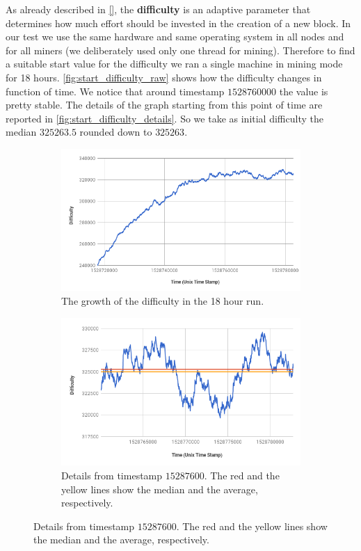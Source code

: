 As already described in \autoref{}, the \textbf{difficulty} is an adaptive
parameter  that determines how much effort should be invested in the creation
of a new block. In our test we use the same hardware and same operating system 
in all nodes and for all miners (we deliberately used only one thread for 
mining). Therefore to find a suitable start value for the difficulty we ran a
single machine in mining mode for 18 hours. \autoref{fig:start_difficulty_raw}
shows how the difficulty changes in function of time. We notice that around
timestamp $1528760000$ the value is pretty stable.
The details of the graph starting from this point of time are reported
in \autoref{fig:start_difficulty_details}.
So we take as initial difficulty the median $325263.5$ rounded down
to $325263$.
\begin{figure}
	\begin{center}
	\begin{subfigure}{.48\textwidth}
		\includegraphics[width=\textwidth]{./res/img/start_difficulty.png}
	
		\caption{The growth of the difficulty in the 18 hour run.}
		\label{fig:start_difficulty_raw}
		
	\end{subfigure}
	\begin{subfigure}{.48\textwidth}
		\includegraphics[width=\textwidth]{./res/img/start_difficulty_details.png}
		\caption{Details from timestamp $15287600$. The red and the
			yellow lines show the median and the average, respectively.}
		\label{fig:start_difficulty_details}
	\end{subfigure}
	

\end{center}
\end{figure}
